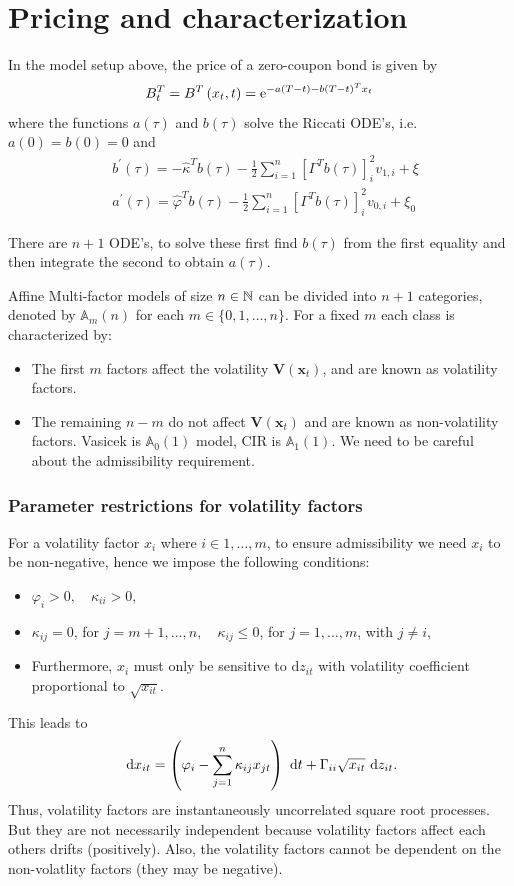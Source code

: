 \section{Pricing and characterization}
In the model setup above, the price of a zero-coupon bond is given by
\[
B_{t}^{T}=B^{T}\left(x_{t}, t\right)=\mathrm{e}^{-a(T-t)-b(T-t)^{T} x_{t}}
\]
where the functions $a(\tau)$ and $b(\tau)$ solve the Riccati ODE's, i.e. $a(0)=b(0)=0$ and
\[
\begin{aligned}
& b^{\prime}(\tau)=-\hat{\kappa}^{T} b(\tau)-\frac{1}{2} \sum_{i=1}^{n}\left[\Gamma^{T} b(\tau)\right]_{i}^{2} v_{1, i}+\xi \\
& a^{\prime}(\tau)=\hat{\varphi}^{T} b(\tau)-\frac{1}{2} \sum_{i=1}^{n}\left[\Gamma^{T} b(\tau)\right]_{i}^{2} v_{0, i}+\xi_{0}
\end{aligned}
\]
\begin{note*}
There are $n+1$ ODE's, to solve these first find $b(\tau)$ from the first equality and then
integrate the second to obtain $a(\tau)$.
\end{note*}


Affine Multi-factor models of size $n \in \mathbb{N}$ can be divided into $n+1$ categories, denoted by
$\mathbb{A}_m(n)$ for each $m \in\{0,1, \ldots, n\}$. For a fixed $m$ each class is characterized
by:
\begin{itemize}
  \item The first $m$ factors affect the volatility $\boldsymbol{V}\left(\boldsymbol{x}_{t}\right)$, and are known as volatility factors.
  \item The remaining $n-m$ do not affect $\boldsymbol{V}\left(\boldsymbol{x}_{t}\right)$ and are known as non-volatility factors. Vasicek is $\mathbb{A}_{0}(1)$ model, CIR is $\mathbb{A}_{1}(1)$. We need to be careful about the admissibility requirement.
\end{itemize}
\subsubsection{Parameter restrictions for volatility factors}
For a volatility factor $x_i$ where $i \in 1,\ldots ,m$, to ensure admissibility we need $x_i$ to be
non-negative, hence we impose the following conditions:
\begin{itemize}
  \item $\varphi_{i}>0, \quad \kappa_{i i}>0, \quad$ 
  \item $\kappa_{i j}=0$, for $j=m+1, \ldots, n, \quad \kappa_{i j} \leq 0$, for $j=1, \ldots, m$,
  with $j \neq i$,
\item Furthermore, $x_{i}$ must only be sensitive to $\text{d} z_{i t}$ with volatility coefficient proportional to $\sqrt{x_{i t}}$.
\end{itemize}
This leads to
\[
\text{ d}  x_{i t}=\left(\varphi_{i}-\sum_{j=1}^{n} \kappa_{i j} x_{j t}\right) \text{ d}  t+\Gamma_{i i}
\sqrt{x_{i t}} \text{ d}  z_{i t} .
\]
Thus, volatility factors are instantaneously uncorrelated square root processes. But they are
not necessarily independent because volatility factors affect each others drifts (positively). Also,
the volatility factors cannot be dependent on the non-volatlity factors (they may be negative).

